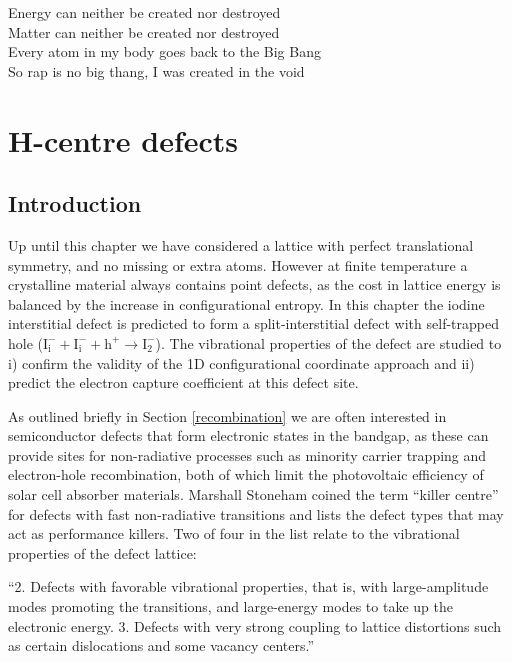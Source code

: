 \begin{savequote}[8cm]
Energy can neither be created nor destroyed \\
Matter can neither be created nor destroyed \\
Every atom in my body goes back to the Big Bang \\
So rap is no big thang, I was created in the void
\end{savequote}

\chapter{\label{ch:6-defects}H-centre defects}

\section{Introduction}

Up until this chapter we have considered a lattice with perfect translational symmetry, and no missing or extra atoms. However at finite temperature a crystalline material always contains point defects, as the cost in lattice energy is balanced by the increase in configurational entropy.
In this chapter the iodine interstitial defect is predicted to form a split-interstitial defect with self-trapped hole ($\mathrm{I}_\mathrm{i}^-+\mathrm{I}_\mathrm{i}^-+\mathrm{h}^+ \rightarrow \mathrm{I}_\mathrm{2}^-$). The vibrational properties of the defect are studied to i) confirm the validity of the 1D configurational coordinate approach and ii) predict the electron capture coefficient at this defect site.

As outlined briefly in Section \ref{recombination} we are often interested in semiconductor defects that form electronic states in the bandgap, as these can provide sites for non-radiative processes such as minority carrier trapping and electron-hole recombination, both of which limit the photovoltaic efficiency of solar cell absorber materials. Marshall Stoneham coined the term ``killer centre'' for defects with fast non-radiative transitions and lists the defect types that may act as performance killers. Two of four in the list relate to the vibrational properties of the defect lattice:

\begin{displayquote}
``2. Defects with favorable vibrational properties, that is, with large-amplitude modes promoting the transitions, and large-energy modes to take up the electronic energy.
3. Defects with very strong coupling to lattice distortions such as certain dislocations and some vacancy centers.''
\end{displayquote}

